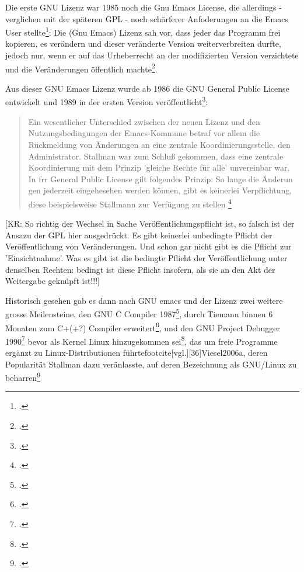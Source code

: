 \documentclass[DIV=calc,BCOR=5mm,11pt,headings=small,oneside,abstract=true, toc=bib]{scrartcl}
\begin{document}
Die erste GNU Lizenz war 1985 noch die \glqq{}Gnu Emacs License\grqq{}, die
allerdings - verglichen mit der späteren GPL - noch schärferer Anfoderungen an
die Emacs User stellte\footcite[vgl.][33]{Viesel2006a}: \glqq{}Die (Gnu Emacs)
Lizenz sah vor, dass jeder das Programm frei kopieren, es verändern und dieser
veränderte Version weiterverbreiten durfte, jedoch nur, wenn er auf das
Urheberrecht an der modifizierten Version verzichtete und die Veränderungen
öffentlich machte\grqq{}\footcite[][33]{Viesel2006a}.

Aus dieser GNU Emacs Lizenz wurde ab 1986 die \glqq{}GNU General Public
License\grqq{} entwickelt und 1989 in der ersten Version
veröffentlicht\footcite[vgl.][34]{Viesel2006a}:

\begin{quote}
\glqq{}Ein wesentlicher Unterschied zwischen der neuen Lizenz und den
Nutzungsbedingungen der Emacs-Kommune betraf vor allem die Rückmeldung von
Änderungen an eine zentrale Koordinierungsstelle, den Administrator. Stallman
war zum Schluß gekommen, dass eine zentrale Koordinierung mit dem Prinzip
'gleiche Rechte für alle' unvereinbar war. In frr General Public License gilt
folgendes Prinzip: So lange die Änderun gen jederzeit eingehesehen werden
können, gibt es keinerlei Verpflichtung, diese beispielsweise Stallmann zur
Verfügung zu stellen
\grqq{}\footcite[][34]{Viesel2006a}
\end{quote}

[KR: So richtig der Wechsel in Sache Veröffentlichungspflicht ist, so falsch
ist der Ansazu der GPL hier ausgedrückt. Es gibt keinerlei unbedingte Pflicht
der Veröffentlichung von Veränderungen. Und schon gar nicht gibt es die Pflicht
zur 'Einsichtnahme'. Was es gibt ist die bedingte Pflicht der Veröffentlichung
unter denselben Rechten: bedingt ist diese Pflicht insofern, als sie an den Akt
der Weitergabe geknüpft ist!!!]

Historisch gesehen gab es dann nach GNU emacs und der Lizenz zwei weitere grosse
Meilensteine, den GNU C Compiler 1987\footcite[vgl.][34]{Viesel2006a}, durch
Tiemann binnen 6 Monaten zum C+(+?) Compiler
erweitert\footcite[vgl.][34 VBiesel schreibt nur vom C+-Compiler,
ist das richtig?]{Viesel2006a}, und den GNU Project Debugger
1990\footcite[vgl.][35]{Viesel2006a} bevor als Kernel Linux hinzugekommen
sei\footcite[vgl.][35]{Viesel2006a}, das um freie Programme ergänzt zu
Linux-Distributionen führtefootcite[vgl.][36]{Viesel2006a}, deren Popularität
Stallman dazu veränlasste, auf deren Bezeichnung als \glqq{}GNU/Linux\grqq{} zu
beharren\footcite[vgl.][37]{Viesel2006a}
\end{document}
